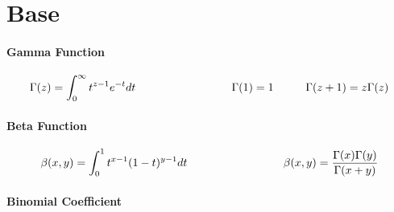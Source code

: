 \documentclass[a4paper,10pt]{article}
\begin{document}
\begin{center}\end{center}
\section{Base }
\paragraph{Gamma Function}
\[
\Gamma(z) = \int_{0}^{\infty} t^{z-1}e^{-t}dt \hspace{30mm}  \Gamma(1) = 1 \hspace{10mm}  \Gamma(z+1) = z\Gamma(z) 
\]
\paragraph{Beta Function}
\[
\beta(x,y)=  \int_{0}^{1}  t^{x-1}(1-t)^{y-1}dt  \hspace{30mm} \beta(x,y)= \frac{\Gamma(x)\Gamma(y)}{\Gamma(x+y)}
\]
\paragraph{Binomial Coefficient}
\end{document}

